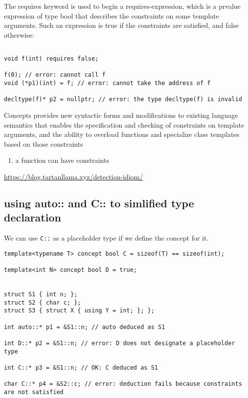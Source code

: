 The requires keyword is used to begin a requires-expression, which is a prvalue
expression of type bool that describes the constraints on some template
arguments. Such an expression is true if the constraints are satisfied, and
false otherwise:

\begin{verbatim}

void f(int) requires false;

f(0); // error: cannot call f
void (*p1)(int) = f; // error: cannot take the address of f 

decltype(f)* p2 = nullptr; // error: the type decltype(f) is invalid
\end{verbatim}

Concepts provides new syntactic forms and modifications to existing language
semantics that enables the specification and checking of constraints on template
arguments, and the ability to overload functions and specialize class templates
based on those constraints

\begin{enumerate}
  \item a function can have constraints
\end{enumerate}

\url{https://blog.tartanllama.xyz/detection-idiom/}

\subsection{using auto:: and C:: to simlified type declaration}

We can use \verb!C::! as a placeholder type if we define the concept for it.

\begin{verbatim}
template<typename T> concept bool C = sizeof(T) == sizeof(int);

template<int N> concept bool D = true;


struct S1 { int n; };
struct S2 { char c; };
struct S3 { struct X { using Y = int; }; };

int auto::* p1 = &S1::n; // auto deduced as S1

int D::* p2 = &S1::n; // error: D does not designate a placeholder type

int C::* p3 = &S1::n; // OK: C deduced as S1

char C::* p4 = &S2::c; // error: deduction fails because constraints are not satisfied
\end{verbatim}


